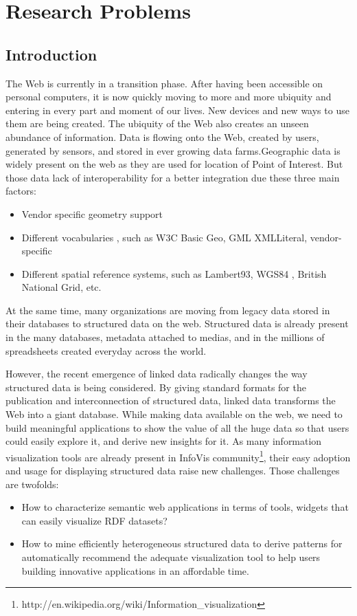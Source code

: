 \documentclass[a4paper,11pt]{report}
\begin{document}


\chapter{Research Problems}

\section{Introduction}
The Web is currently in a transition phase. After having been accessible on personal computers, it is now 
quickly moving to more and more ubiquity and entering in every part and moment of our lives. New 
devices and new ways to use them are being created. The ubiquity of the Web also creates an unseen 
abundance of information. Data is flowing onto the Web, created by users, generated by sensors, and 
stored in ever growing data farms.Geographic data is widely present on the web as they are used for location 
of Point of Interest. But those data lack of interoperability for a better integration due these three main factors:
\begin{itemize}
\item Vendor specific geometry support
\item Different vocabularies , such as W3C Basic Geo, GML XMLLiteral, vendor-specific
\item Different spatial reference systems, such as Lambert93, WGS84 , British National Grid, etc.
\end{itemize}
At the same time, many organizations are moving from legacy data stored in their databases
to structured data on the web. Structured data is already present in the many databases, metadata attached to medias, and in the millions of spreadsheets created everyday across the world. 

However, the recent emergence of linked data radically changes the way structured data is being considered. By giving standard formats for the publication and interconnection of structured data, linked data transforms the Web into a giant database. While making data available on the web, we need to build meaningful applications to show the value of all the huge data so that users could easily explore it, and derive new insights for it. As many information visualization tools are already present in InfoVis community\footnote{http://en.wikipedia.org/wiki/Information\_visualization}, their easy adoption and usage for displaying structured data raise new challenges. Those challenges are twofolds:
\begin{itemize}
\item How to characterize semantic web applications in terms of tools, widgets that can easily visualize RDF datasets?
\item How to mine efficiently heterogeneous structured data to derive patterns for automatically recommend the adequate visualization tool to help users building innovative applications in an affordable time.
\end{itemize}
\end{document}
